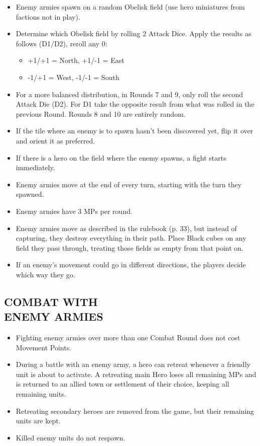 \begin{multicols}{2}
\begin{itemize}
  \item Enemy armies spawn on a random Obelisk field (use hero miniatures from factions not in play).
  \item Determine which Obelisk field by rolling 2 Attack Dice. Apply the results as follows (D1/D2), reroll any 0:
  \begin{itemize}[leftmargin=15pt]
    \item +1/+1 = North, +1/-1 = East
    \item -1/+1 = West, -1/-1 = South
  \end{itemize}
  \item For a more balanced distribution, in Rounds 7 and 9, only roll the second Attack Die (D2). For D1 take the opposite result from what was rolled in the previous Round.
  Rounds 8 and 10 are entirely random.
  \item If the tile where an enemy is to spawn hasn't been discovered yet, flip it over and orient it as preferred.
  \item If there is a hero on the field where the enemy spawns, a fight starts immediately.
  \item Enemy armies move at the end of every turn, starting with the turn they spawned.
  \item Enemy armies have 3 MPs per round.
  \item Enemy armies move as described in the rulebook (p. 33), but instead of capturing, they destroy everything in their path.
    Place Black cubes on any field they pass through, treating those fields as empty from that point on.
  \item If an enemy's movement could go in different directions, the players decide which way they go.
\end{itemize}

\subsection*{\MakeUppercase{Combat with\\Enemy Armies}}

\begin{itemize}
  \item Fighting enemy armies over more than one Combat Round does not cost Movement Points.
  \item During a battle with an enemy army, a hero can retreat whenever a friendly unit is about to activate.
    A retreating main Hero loses all remaining MPs and is returned to an allied town or settlement of their choice, keeping all remaining units.
  \item Retreating secondary heroes are removed from the game, but their remaining units are kept.
  \item Killed enemy units do not respawn.
\end{itemize}


\end{multicols}
